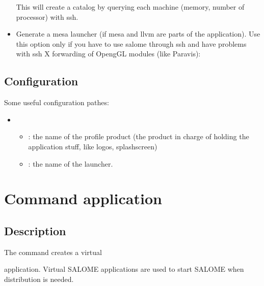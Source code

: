 \documentclass[a4paper,10pt,english]{sphinxmanual}
\begin{document}
\begin{itemize}
This will create a catalog by querying each machine (memory, number of processor) with ssh.

\item {} 
Generate a mesa launcher (if mesa and llvm are parts of the application). Use this option only if you have to use salome through ssh and have problems with ssh X forwarding of OpengGL modules (like Paravis):

%
\begin{sphinxVerbatim}[commandchars=\\\{\}]
   
\end{sphinxVerbatim}

\end{itemize}


\subsection{Configuration}
\label{\detokenize{commands/launcher:configuration}}
Some useful configuration pathes:
\begin{itemize}
\item {} 
\begin{itemize}
\item {} 
 : the name of the profile product (the product in charge of holding the application stuff, like logos, splashscreen)

\item {} 
 : the name of the launcher.

\end{itemize}

\end{itemize}

\clearpage


\section{Command application}
\label{\detokenize{commands/application:svn}}\label{\detokenize{commands/application::doc}}\label{\detokenize{commands/application:command-application}}

\subsection{Description}
\label{\detokenize{commands/application:description}}
The  command creates a virtual %
\begin{footnote}[7]\sphinxAtStartFootnote
{}
%
\end{footnote} application.
Virtual SALOME applications are used to start SALOME when distribution is needed.
\end{document}
